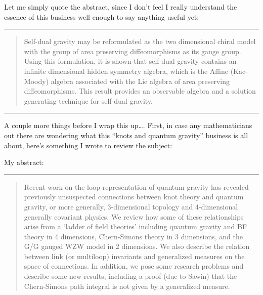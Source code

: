 \documentclass{article}
\def\tightlist{}
\renewcommand{\texttt}[1]{%
  \begingroup
  \ttfamily
  \begingroup\lccode`~=`/\lowercase{\endgroup\def~}{/\discretionary{}{}{}}%
  \begingroup\lccode`~=`[\lowercase{\endgroup\def~}{[\discretionary{}{}{}}%
  \begingroup\lccode`~=`.\lowercase{\endgroup\def~}{.\discretionary{}{}{}}%
  \catcode`/=\active\catcode`[=\active\catcode`.=\active
  \scantokens{#1\noexpand}%
  \endgroup
}
\begin{document}
Let me simply quote the abstract, since I don't feel I really understand
the essence of this business well enough to say anything useful yet:

\begin{center}\rule{0.5\linewidth}{0.5pt}\end{center}

\begin{quote}
Self-dual gravity may be reformulated as the two dimensional chiral
model with the group of area preserving diffeomorphisms as its gauge
group. Using this formulation, it is shown that self-dual gravity
contains an infinite dimensional hidden symmetry algebra, which is the
Affine (Kac-Moody) algebra associated with the Lie algebra of area
preserving diffeomorphisms. This result provides an observable algebra
and a solution generating technique for self-dual gravity.
\end{quote}

\begin{center}\rule{0.5\linewidth}{0.5pt}\end{center}

A couple more things before I wrap this up\ldots. First, in case any
mathematicians out there are wondering what this ``knots and quantum
gravity'' business is all about, here's something I wrote to review the
subject:


My abstract:

\begin{center}\rule{0.5\linewidth}{0.5pt}\end{center}

\begin{quote}
Recent work on the loop representation of quantum gravity has revealed
previously unsuspected connections between knot theory and quantum
gravity, or more generally, 3-dimensional topology and 4-dimensional
generally covariant physics. We review how some of these relationships
arise from a `ladder of field theories' including quantum gravity and BF
theory in 4 dimensions, Chern-Simons theory in 3 dimensions, and the G/G
gauged WZW model in 2 dimensions. We also describe the relation between
link (or multiloop) invariants and generalized measures on the space of
connections. In addition, we pose some research problems and describe
some new results, including a proof (due to Sawin) that the Chern-Simons
path integral is not given by a generalized measure.
\end{quote}
\end{document}
